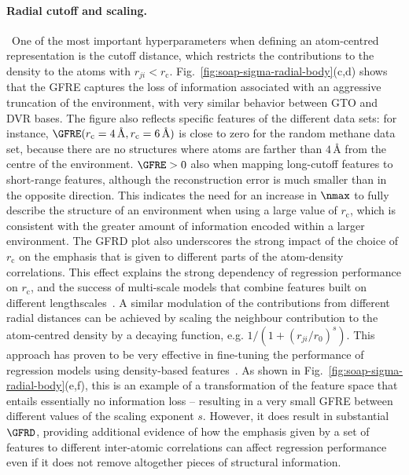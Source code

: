 \paragraph*{Radial cutoff and scaling.}\,
One of the most important hyperparameters when defining an atom-centred representation is the cutoff distance, which restricts the contributions to the density to the atoms with $r_{ji}<r_{\text{c}}$.
Fig.~\ref{fig:soap-sigma-radial-body}(c,d) shows that the GFRE captures the loss of information associated with an aggressive truncation of the environment, with very similar behavior between GTO and DVR bases. 
The figure also reflects specific features of the different data sets: for instance, $\GFRE(r_\text{c}=4\,\text{\AA},r_\text{c}=6\,\text{\AA})$ is close to zero for the random methane data set, because there are no structures where atoms are farther than $4\,$\AA{} from the centre of the environment. $\GFRE>0$ also when mapping long-cutoff features to short-range features, although the reconstruction error is much smaller than in the opposite direction. 
This indicates the need for an increase in $\nmax$ to fully describe the structure of an environment when using a large value of $r_\text{c}$, which is consistent with the greater amount of information encoded within a larger environment.
The GFRD plot also underscores the strong impact of the choice of $r_\text{c}$ on the emphasis that is given to different parts of the atom-density correlations. 
This effect explains the strong dependency of regression performance on $r_\text{c}$, and the success of multi-scale models that combine features built on different lengthscales~\cite{bart+17sa}. 
A similar modulation of the contributions from different radial distances can be achieved by scaling the neighbour contribution to the atom-centred density by a decaying function, e.g. $1/(1+(r_{ji}/r_0)^s)$. This approach has proven to be very effective in fine-tuning the performance of regression models using density-based features~\cite{fabe+17jctc,will+18pccp,paru+18ncomm}.
As shown in Fig.~\ref{fig:soap-sigma-radial-body}(e,f), this is an example of a transformation of the feature space that entails essentially no information loss -- resulting in a very small GFRE between different values of the scaling exponent $s$. However, it does result in substantial $\GFRD$, providing additional evidence of how the emphasis given by a set of features to different inter-atomic correlations can affect regression performance even if it does not remove altogether pieces of structural information.


